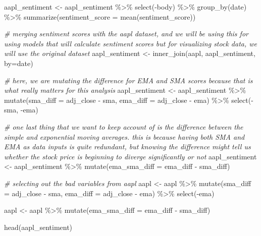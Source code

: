 \documentclass[
]{article}
\newenvironment{Shaded}{\begin{snugshade}}{\end{snugshade}}
\newcommand{\AttributeTok}[1]{\textcolor[rgb]{0.77,0.63,0.00}{#1}}
\newcommand{\CommentTok}[1]{\textcolor[rgb]{0.56,0.35,0.01}{\textit{#1}}}
\newcommand{\FunctionTok}[1]{\textcolor[rgb]{0.00,0.00,0.00}{#1}}
\newcommand{\NormalTok}[1]{#1}
\newcommand{\OtherTok}[1]{\textcolor[rgb]{0.56,0.35,0.01}{#1}}
\newcommand{\SpecialCharTok}[1]{\textcolor[rgb]{0.00,0.00,0.00}{#1}}
\newcommand{\StringTok}[1]{\textcolor[rgb]{0.31,0.60,0.02}{#1}}
\begin{document}
\begin{Shaded}
\begin{Highlighting}[]
\NormalTok{aapl\_sentiment }\OtherTok{\textless{}{-}}\NormalTok{ aapl\_sentiment }\SpecialCharTok{\%\textgreater{}\%}
  \FunctionTok{select}\NormalTok{(}\SpecialCharTok{{-}}\NormalTok{body) }\SpecialCharTok{\%\textgreater{}\%}
  \FunctionTok{group\_by}\NormalTok{(date) }\SpecialCharTok{\%\textgreater{}\%}
  \FunctionTok{summarize}\NormalTok{(}\AttributeTok{sentiment\_score =} \FunctionTok{mean}\NormalTok{(sentiment\_score))}

\CommentTok{\# merging sentiment scores with the aapl dataset, and we will be using this for using models that will calculate sentiment scores but for visualizing stock data, we will use the original dataset }
\NormalTok{aapl\_sentiment }\OtherTok{\textless{}{-}} \FunctionTok{inner\_join}\NormalTok{(aapl, aapl\_sentiment, }\AttributeTok{by=}\StringTok{\textquotesingle{}date\textquotesingle{}}\NormalTok{)}

\CommentTok{\# here, we are mutating the difference for EMA and SMA scores because that is what really matters for this analysis}
\NormalTok{aapl\_sentiment }\OtherTok{\textless{}{-}}\NormalTok{ aapl\_sentiment }\SpecialCharTok{\%\textgreater{}\%}
  \FunctionTok{mutate}\NormalTok{(}\AttributeTok{sma\_diff =}\NormalTok{ adj\_close }\SpecialCharTok{{-}}\NormalTok{ sma, }\AttributeTok{ema\_diff =}\NormalTok{ adj\_close }\SpecialCharTok{{-}}\NormalTok{ ema) }\SpecialCharTok{\%\textgreater{}\%}
  \FunctionTok{select}\NormalTok{(}\SpecialCharTok{{-}}\NormalTok{sma, }\SpecialCharTok{{-}}\NormalTok{ema)}

\CommentTok{\# one last thing that we want to keep account of is the difference between the simple and exponential moving averages. this is because having both SMA and EMA as data inputs is quite redundant, but knowing the difference might tell us whether the stock price is beginning to diverge significantly or not}
\NormalTok{aapl\_sentiment }\OtherTok{\textless{}{-}}\NormalTok{ aapl\_sentiment }\SpecialCharTok{\%\textgreater{}\%}
  \FunctionTok{mutate}\NormalTok{(}\AttributeTok{ema\_sma\_diff =}\NormalTok{ ema\_diff }\SpecialCharTok{{-}}\NormalTok{ sma\_diff)}

\CommentTok{\# selecting out the bad variables from aapl}
\NormalTok{aapl }\OtherTok{\textless{}{-}}\NormalTok{ aapl }\SpecialCharTok{\%\textgreater{}\%}
  \FunctionTok{mutate}\NormalTok{(}\AttributeTok{sma\_diff =}\NormalTok{ adj\_close }\SpecialCharTok{{-}}\NormalTok{ sma, }\AttributeTok{ema\_diff =}\NormalTok{ adj\_close }\SpecialCharTok{{-}}\NormalTok{ ema) }\SpecialCharTok{\%\textgreater{}\%}
  \FunctionTok{select}\NormalTok{(}\SpecialCharTok{{-}}\NormalTok{ema)}

\NormalTok{aapl }\OtherTok{\textless{}{-}}\NormalTok{ aapl }\SpecialCharTok{\%\textgreater{}\%}
  \FunctionTok{mutate}\NormalTok{(}\AttributeTok{ema\_sma\_diff =}\NormalTok{ ema\_diff }\SpecialCharTok{{-}}\NormalTok{ sma\_diff)}

\FunctionTok{head}\NormalTok{(aapl\_sentiment)}
\end{Highlighting}
\end{Shaded}
\end{document}
